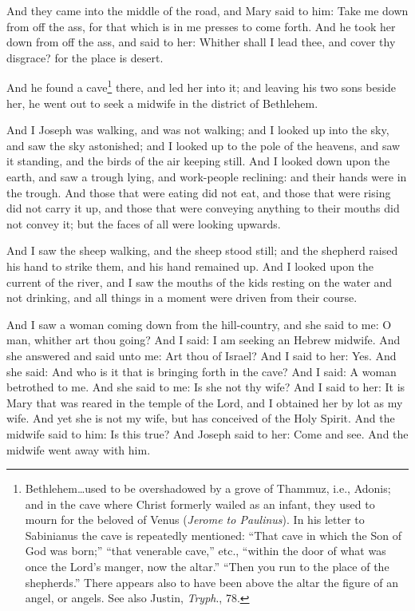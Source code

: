\pend\pstart
And they came into the middle of the road, and Mary said to him: Take me down from off the ass, for that which is in me presses to come forth. And he took her down from off the ass, and said to her: Whither shall I lead thee, and cover thy disgrace? for the place is desert.

\pend\pstart
{}

\pend\setcounter{pstartR}{1}\pstart
And he found a cave\footnote{Bethlehem…used to be overshadowed by a grove of Thammuz, i.e., Adonis; and in the cave where Christ formerly wailed as an infant, they used to mourn for the beloved of Venus (\textit{Jerome to Paulinus}). In his letter to Sabinianus the cave is repeatedly mentioned: ``That cave in which the Son of God was born;'' ``that venerable cave,'' etc., ``within the door of what was once the Lord's manger, now the altar.'' ``Then you run to the place of the shepherds.'' There appears also to have been above the altar the figure of an angel, or angels. See also Justin, \textit{Tryph}., 78.} there, and led her into it; and leaving his two sons beside her, he went out to seek a midwife in the district of Bethlehem.

\pend\pstart
And I Joseph was walking, and was not walking; and I looked up into the sky, and saw the sky astonished; and I looked up to the pole of the heavens, and saw it standing, and the birds of the air keeping still. And I looked down upon the earth, and saw a trough lying, and work-people reclining: and their hands were in the trough. And those that were eating did not eat, and those that were rising did not carry it up, and those that were conveying anything to their mouths did not convey it; but the faces of all were looking upwards.

\pend\pstart
And I saw the sheep walking, and the sheep stood still; and the shepherd raised his hand to strike them, and his hand remained up. And I looked upon the current of the river, and I saw the mouths of the kids resting on the water and not drinking, and all things in a moment were driven from their course.

\pend\pstart
{}

\pend\setcounter{pstartR}{1}\pstart
And I saw a woman coming down from the hill-country, and she said to me: O man, whither art thou going? And I said: I am seeking an Hebrew midwife. And she answered and said unto me: Art thou of Israel? And I said to her: Yes. And she said: And who is it that is bringing forth in the cave? And I said: A woman betrothed to me. And she said to me: Is she not thy wife? And I said to her: It is Mary that was reared in the temple of the Lord, and I obtained her by lot as my wife. And yet she is not my wife, but has conceived of the Holy Spirit. And the midwife said to him: Is this true? And Joseph said to her: Come and see. And the midwife went away with him.

